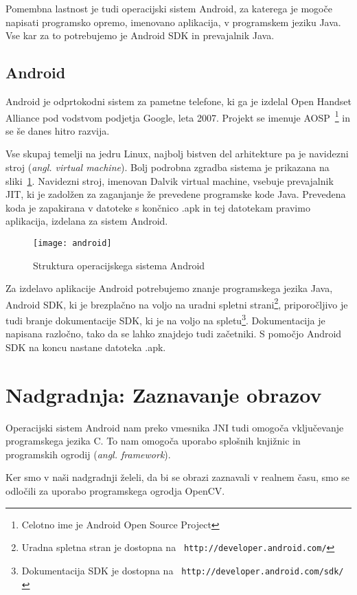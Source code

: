 Pomembna lastnost je tudi operacijski sistem Android, za katerega je mogoče
napisati programsko opremo, imenovano aplikacija, v programskem jeziku Java.
Vse kar za to potrebujemo je Android SDK in prevajalnik Java.


\section{Android}
Android je odprtokodni sistem za pametne telefone, ki ga je izdelal Open
Handset Alliance pod vodstvom podjetja Google, leta 2007. Projekt se imenuje
AOSP~\footnote{Celotno ime je Android Open Source Project} in se še danes
hitro razvija.

Vse skupaj temelji na jedru Linux, najbolj bistven del arhitekture pa je
navidezni stroj (\textit{angl. virtual machine}). Bolj podrobna zgradba
sistema je prikazana na sliki~\ref{picAndroid}. Navidezni stroj, imenovan
Dalvik virtual machine, vsebuje prevajalnik JIT, ki je zadolžen za zaganjanje
že prevedene programske kode Java. Prevedena koda je zapakirana v datoteke s
končnico .apk in tej datotekam pravimo aplikacija, izdelana za sistem Android.

\begin{figure}
    \centering
    \texttt{[image: android]}
    \caption{Struktura operacijskega sistema Android~\cite{wiki:Android}}
    \label{picAndroid}
\end{figure}

Za izdelavo aplikacije Android potrebujemo znanje programskega jezika Java,
Android SDK, ki je brezplačno na voljo na uradni spletni
strani\footnote{Uradna spletna stran je dostopna na {\tt
http://developer.android.com/}}, priporočljivo je tudi branje dokumentacije
SDK, ki je na voljo na spletu\footnote{Dokumentacija SDK je dostopna na {\tt
http://developer.android.com/sdk/}}. Dokumentacija je napisana razločno, tako
da se lahko znajdejo tudi začetniki. S pomočjo Android SDK na koncu nastane
datoteka .apk.

\chapter{Nadgradnja: Zaznavanje obrazov}
Operacijski sistem Android nam preko vmesnika JNI tudi omogoča vključevanje programskega jezika C. To nam omogoča uporabo splošnih knjižnic in programskih ogrodij (\textit{angl. framework}).

Ker smo v naši nadgradnji želeli, da bi se obrazi zaznavali v realnem času, smo se odločili za uporabo programskega ogrodja OpenCV.

